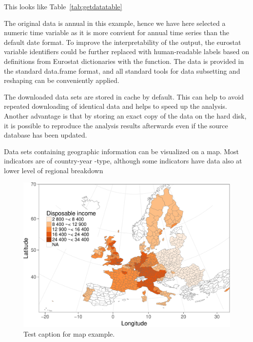 This looks like Table~\ref{tab:getdatatable}

The original data is annual in this example, hence we have here
selected a numeric time variable as it is more convient for annual
time series than the default date format. To improve the
interpretability of the output, the eurostat variable identifiers
could be further replaced with human-readable labels based on
definitions from Eurostat dictionaries with the 
function. The data is provided in the standard data.frame format, and
all standard tools for data subsetting and reshaping can be
conveniently applied.

The downloaded data sets are stored in cache by default. This can help
to avoid repeated downloading of identical data and helps to speed up
the analysis. Another advantage is that by storing an exact copy of
the data on the hard disk, it is possible to reproduce the analysis
results afterwards even if the source database has been updated.

Data sets containing geographic information can be visualized on a
map. Most indicators are of country-year -type, although some
indicators have data also at lower level of regional breakdown

\begin{figure}
\begin{center}
\includegraphics{2015-manu-mapexample-1}
\caption{Test caption for map example.}
\label{fig:mapexample}
\end{center}
\end{figure}


